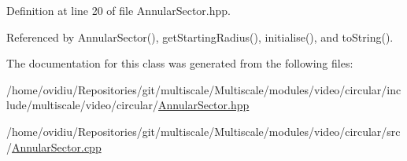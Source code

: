 Definition at line 20 of file Annular\-Sector.\-hpp.



Referenced by Annular\-Sector(), get\-Starting\-Radius(), initialise(), and to\-String().



The documentation for this class was generated from the following files\-:\begin{DoxyCompactItemize}
\item 
/home/ovidiu/\-Repositories/git/multiscale/\-Multiscale/modules/video/circular/include/multiscale/video/circular/\hyperlink{AnnularSector_8hpp}{Annular\-Sector.\-hpp}\item 
/home/ovidiu/\-Repositories/git/multiscale/\-Multiscale/modules/video/circular/src/\hyperlink{AnnularSector_8cpp}{Annular\-Sector.\-cpp}\end{DoxyCompactItemize}
